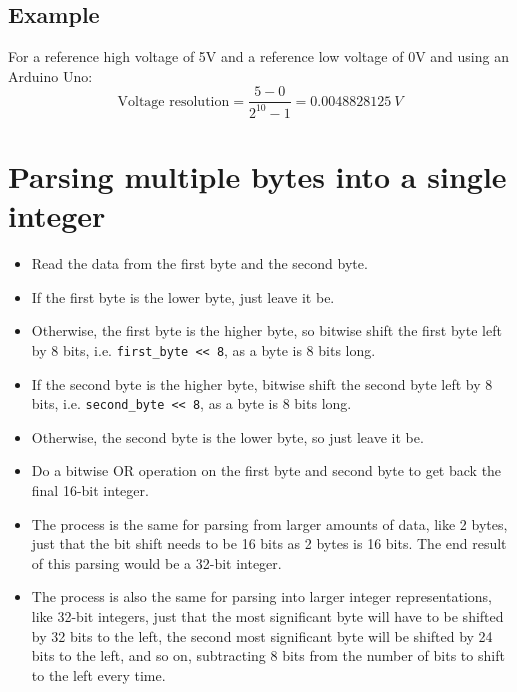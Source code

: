 \documentclass[11pt]{article}
\begin{document}
\subsection{Example}
\label{sec:orga49be6e}
For a reference high voltage of 5V and a reference low voltage of 0V and using an Arduino Uno:
\[\text{Voltage resolution} = \frac{5 - 0}{2^{10} - 1} = \qty{0.0048828125}{V}\]

 \newpage
\section{Parsing multiple bytes into a single integer}
\label{sec:org1dff154}
\begin{itemize}
\item Read the data from the first byte and the second byte.
\item If the first byte is the lower byte, just leave it be.
\item Otherwise, the first byte is the higher byte, so bitwise shift the first byte left by 8 bits, i.e. \texttt{first\_byte <{}<{} 8}, as a byte is 8 bits long.
\item If the second byte is the higher byte, bitwise shift the second byte left by 8 bits, i.e. \texttt{second\_byte <{}<{} 8}, as a byte is 8 bits long.
\item Otherwise, the second byte is the lower byte, so just leave it be.
\item Do a bitwise OR operation on the first byte and second byte to get back the final 16-bit integer.
\item The process is the same for parsing from larger amounts of data, like 2 bytes, just that the bit shift needs to be 16 bits as 2 bytes is 16 bits. The end result of this parsing would be a 32-bit integer.
\item The process is also the same for parsing into larger integer representations, like 32-bit integers, just that the most significant byte will have to be shifted by 32 bits to the left, the second most significant byte will be shifted by 24 bits to the left, and so on, subtracting 8 bits from the number of bits to shift to the left every time.
\end{itemize}
\end{document}
